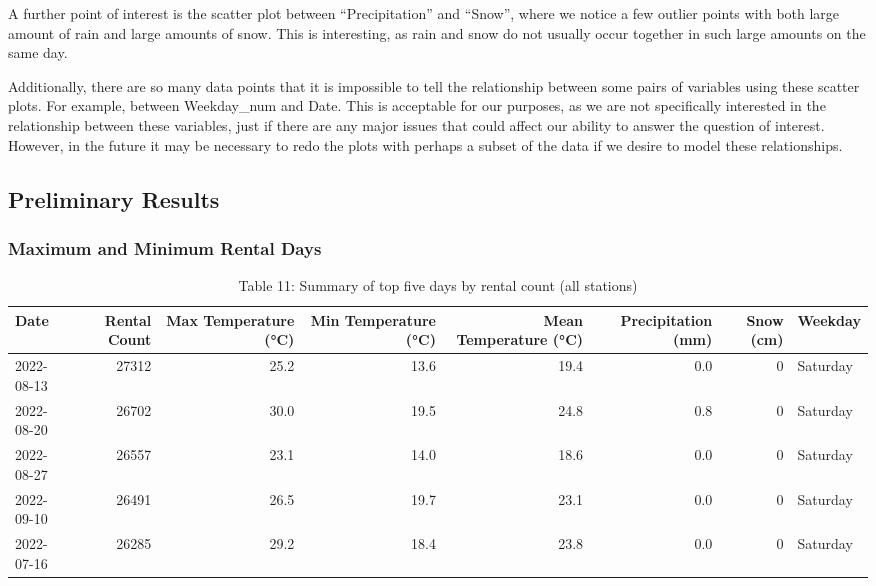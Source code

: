\documentclass[
]{article}
\begin{document}
A further point of interest is the scatter plot between
``Precipitation'' and ``Snow'', where we notice a few outlier points
with both large amount of rain and large amounts of snow. This is
interesting, as rain and snow do not usually occur together in such
large amounts on the same day.

Additionally, there are so many data points that it is impossible to
tell the relationship between some pairs of variables using these
scatter plots. For example, between Weekday\_num and Date. This is
acceptable for our purposes, as we are not specifically interested in
the relationship between these variables, just if there are any major
issues that could affect our ability to answer the question of interest.
However, in the future it may be necessary to redo the plots with
perhaps a subset of the data if we desire to model these relationships.

\hypertarget{preliminary-results}{%
\subsection{Preliminary Results}\label{preliminary-results}}

\hypertarget{maximum-and-minimum-rental-days}{%
\subsubsection{Maximum and Minimum Rental
Days}\label{maximum-and-minimum-rental-days}}

\begin{table}[!h]

\caption{\label{tab:Table 11 conditions for maximum bike share riders (all stations)}Table 11: Summary of top five days by rental count (all stations)}
\centering
\begin{tabular}[t]{l|r|r|r|r|r|r|l}
\hline
Date & Rental Count & Max Temperature (°C) & Min Temperature (°C) & Mean Temperature (°C) & Precipitation (mm) & Snow (cm) & Weekday\\
\hline
2022-08-13 & 27312 & 25.2 & 13.6 & 19.4 & 0.0 & 0 & Saturday\\
\hline
2022-08-20 & 26702 & 30.0 & 19.5 & 24.8 & 0.8 & 0 & Saturday\\
\hline
2022-08-27 & 26557 & 23.1 & 14.0 & 18.6 & 0.0 & 0 & Saturday\\
\hline
2022-09-10 & 26491 & 26.5 & 19.7 & 23.1 & 0.0 & 0 & Saturday\\
\hline
2022-07-16 & 26285 & 29.2 & 18.4 & 23.8 & 0.0 & 0 & Saturday\\
\hline
\end{tabular}
\end{table}
\end{document}
